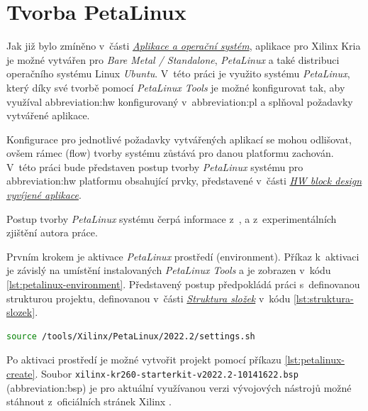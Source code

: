 \documentclass[a4paper, twoside, 11pt]{article}
\begin{document}
	\section{Tvorba PetaLinux}\label{subsec:tvorba-petalinux}
	Jak již bylo zmíněno v~části \hyperref[subsec:aplikace-a-operacni-system]{\textit{Aplikace a operační systém}}, aplikace pro Xilinx Kria je možné vytvářen pro \textit{Bare Metal / Standalone}, \textit{PetaLinux} a také distribuci operačního systému Linux \textit{Ubuntu}. V~této práci je využito systému \textit{PetaLinux}, který díky své tvorbě pomocí \textit{PetaLinux Tools} je možné konfigurovat tak, aby využíval \gls{abbreviation:hw} konfigurovaný v~\gls{abbreviation:pl} a splňoval požadavky vytvářené aplikace.\par
	Konfigurace pro jednotlivé požadavky vytvářených aplikací se mohou odlišovat, ovšem rámec (flow) tvorby systému zůstává pro danou platformu zachován. V~této práci bude představen postup tvorby \textit{PetaLinux} systému pro \gls{abbreviation:hw} platformu obsahující prvky, představené v~části \hyperref[subsubsec:hw-block-design-vyvijene-aplikace]{\textit{HW block design vyvíjené aplikace}}.\par
	Postup tvorby \textit{PetaLinux} systému čerpá informace z~\cite{hackster-getting-started-with-the-kria-kr260-in-petalinux}, \cite{xilinx-github-vitis-tutorials-step-2-create-the-software-components} a z~experimentálních zjištění autora práce.\par
	Prvním krokem je aktivace \textit{PetaLinux} prostředí (environment). Příkaz k~aktivaci je závislý na umístění instalovaných \textit{PetaLinux Tools} a je zobrazen v~kódu \ref{lst:petalinux-environment}. Představený postup předpokládá práci s~definovanou strukturou projektu, definovanou v~části \hyperref[sec:struktura-slozek]{\textit{Struktura složek}} v~kódu \ref{lst:struktura-slozek}.


	\begin{lstlisting}[language={sh}, caption={Aktivace prostředí PetaLinux verze 2022.2.}, label= {lst:petalinux-environment}, morekeywords={source}]
source /tools/Xilinx/PetaLinux/2022.2/settings.sh\end{lstlisting}

	Po aktivaci prostředí je možné vytvořit projekt pomocí příkazu \ref{lst:petalinux-create}. Soubor \texttt{xilinx-kr260-starterkit-v2022.2-10141622.bsp} (\gls{abbreviation:bsp}) je pro aktuální využívanou verzi vývojových nástrojů možné stáhnout z~oficiálních stránek Xilinx \cite{xilinx-downloads}.
\end{document}
